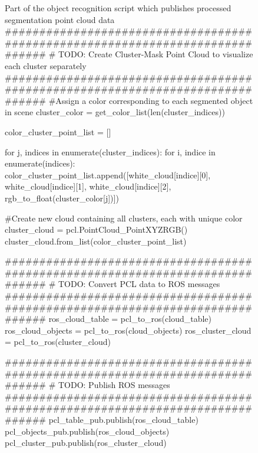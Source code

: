 \documentclass[a4paper]{article}
\begin{document}
\begin{figure}[]\scriptsize
\begin{sexylisting}{Part of the object recognition script which publishes processed segmentation point cloud data}
##############################################################################
# TODO: Create Cluster-Mask Point Cloud to visualize each cluster separately
##############################################################################
    #Assign a color corresponding to each segmented object in scene
    cluster_color = get_color_list(len(cluster_indices))

    color_cluster_point_list = []

    for j, indices in enumerate(cluster_indices):
        for i, indice in enumerate(indices):
            color_cluster_point_list.append([white_cloud[indice][0],
                           white_cloud[indice][1],
                           white_cloud[indice][2],
                           rgb_to_float(cluster_color[j])])

    #Create new cloud containing all clusters, each with unique color
    cluster_cloud = pcl.PointCloud_PointXYZRGB()
    cluster_cloud.from_list(color_cluster_point_list)


##############################################################################
# TODO: Convert PCL data to ROS messages
##############################################################################
    ros_cloud_table = pcl_to_ros(cloud_table)
    ros_cloud_objects = pcl_to_ros(cloud_objects)
    ros_cluster_cloud = pcl_to_ros(cluster_cloud)


##############################################################################
# TODO: Publish ROS messages
##############################################################################
    pcl_table_pub.publish(ros_cloud_table)
    pcl_objects_pub.publish(ros_cloud_objects)
    pcl_cluster_pub.publish(ros_cluster_cloud)
\end{sexylisting}
\end{figure}
\end{document}
